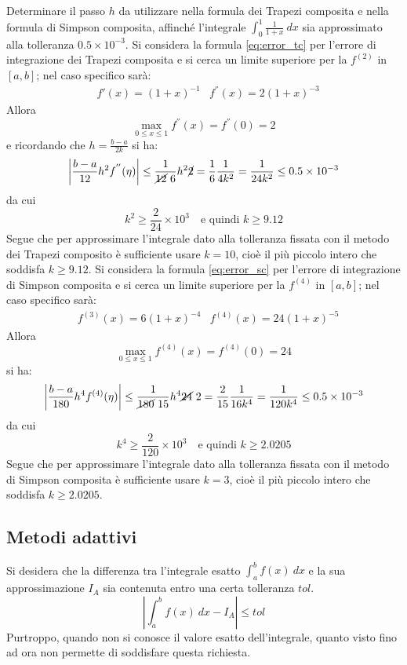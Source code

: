 \documentclass{article}
\begin{document}
\begin{example}
   Determinare il passo $h$ da utilizzare nella formula dei Trapezi composita
   e nella formula di Simpson composita, affinché
   l'integrale $\displaystyle\int_{0}^{1}\frac{1}{1+x}\ dx$ sia approssimato alla
   tolleranza $0.5\times 10^{-3}$.
   \vskip 0.1in
   Si considera la formula \ref{eq:error_tc} per l'errore di integrazione dei
   Trapezi composita e si cerca un limite superiore per la $f^{(2)}$ in
   $[a,b]$; nel caso specifico sarà:
   \begin{equation*} 
       \begin{aligned}
           & f'(x)=(1+x)^{-1} & f^{''}(x)=2(1+x)^{-3}
       \end{aligned}
   \end{equation*}
   Allora 
   $$\max_{0\leq x\leq 1}f^{''}(x)=f^{''}(0)=2$$
   e ricordando che $h=\frac{b-a}{2k}$ si ha:
   $$\left\lvert\frac{b-a}{12}h^2f^{''}(\eta) \right\lvert\leq 
           \frac{1}{\cancel{12}\
           6}h^2\cancel{2}=\frac{1}{6}\frac{1}{4k^2}=\frac{1}{24k^2}\leq 0.5\times10^{-3}$$
   da cui 
   $$k^2\geq \frac{2}{24}\times 10^3\quad \text{e quindi }k\geq9.12$$
   Segue che per approssimare l'integrale dato alla tolleranza fissata con il
   metodo dei Trapezi composito è sufficiente usare $k=10$, cioè il più
   piccolo intero che soddisfa $k\geq 9.12$.
   \vskip 0.1in
   Si considera la formula \ref{eq:error_sc} per l'errore di integrazione di
   Simpson composita e si cerca un limite superiore per la $f^{(4)}$ in
   $[a,b]$; nel caso specifico sarà:
   \begin{equation*} 
       \begin{aligned}
           & f^{(3)}(x)=6(1+x)^{-4} & f^{(4)}(x)=24(1+x)^{-5}
       \end{aligned}
   \end{equation*}
   Allora 
   $$\max_{0\leq x\leq 1}f^{(4)}(x)=f^{(4)}(0)=24$$
   si ha:
   $$\left\lvert\frac{b-a}{180}h^4f^{(4)}(\eta) \right\lvert\leq 
       \frac{1}{\cancel{180}\ 15}h^4 \cancel{24}\ 2=\frac{2}{15}\frac{1}{16k^4}=\frac{1}{120k^4}\leq 0.5\times10^{-3}$$
   da cui 
   $$k^4\geq \frac{2}{120}\times 10^3\quad \text{e quindi }k\geq2.0205$$
   Segue che per approssimare l'integrale dato alla tolleranza fissata con il
   metodo di Simpson composita è sufficiente usare $k=3$, cioè il più
   piccolo intero che soddisfa $k\geq 2.0205$.
\end{example}
\subsection{Metodi adattivi}
Si desidera che la differenza tra l'integrale esatto
$\displaystyle\int_{a}^{b}f(x)\ dx$ e la sua approssimazione $I_A$ sia
contenuta entro una certa tolleranza $tol$. 
$$\left\lvert \displaystyle\int_{a}^{b}f(x)\ dx- I_A\right\rvert\leq tol$$
Purtroppo, quando non si conosce il valore esatto dell'integrale, quanto visto
fino ad ora non permette di soddisfare questa richiesta.
\end{document}
